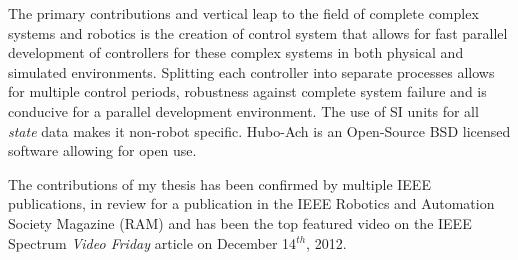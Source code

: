 The primary contributions and vertical leap to the field of complete complex systems and robotics is the creation of control system that allows for fast parallel development of controllers for these complex systems in both physical and simulated environments.
Splitting each controller into separate processes allows for multiple control periods, robustness against complete system failure and is conducive for a parallel development environment.
The use of SI units for all \textit{state} data makes it non-robot specific.
Hubo-Ach is an Open-Source BSD licensed software allowing for open use.

The contributions of my thesis has been confirmed by multiple IEEE publications\cite{lofaroTePRA2013HuboAch,lofaroTePRA2013Valve}, in review for a publication in the IEEE Robotics and Automation Society Magazine (RAM)\cite{lofaroRAM2013} and has been the top featured video on the IEEE Spectrum \textit{Video Friday} article on December 14$^{th}$, 2012\cite{videoFriday}.
